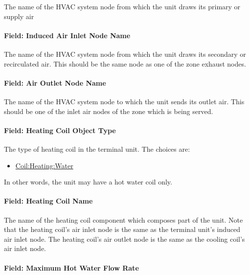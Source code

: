 The name of the HVAC system node from which the unit draws its primary or supply air

\paragraph{Field: Induced Air Inlet Node Name}\label{field-induced-air-inlet-node-name}

The name of the HVAC system node from which the unit draws its secondary or recirculated air. This should be the same node as one of the zone exhaust nodes.

\paragraph{Field: Air Outlet Node Name}\label{field-air-outlet-node-name-6}

The name of the HVAC system node to which the unit sends its outlet air. This should be one of the inlet air nodes of the zone which is being served.

\paragraph{Field: Heating Coil Object Type}\label{field-heating-coil-object-type-1}

The type of heating coil in the terminal unit. The choices are:

\begin{itemize}
\tightlist
\item
  \hyperref[coilheatingwater]{Coil:Heating:Water}
\end{itemize}

In other words, the unit may have a hot water coil only.

\paragraph{Field: Heating Coil Name}\label{field-heating-coil-name-1}

The name of the heating coil component which composes part of the unit. Note that the heating coil's air inlet node is the same as the terminal unit's induced air inlet node. The heating coil's air outlet node is the same as the cooling coil's air inlet node.

\paragraph{Field: Maximum Hot Water Flow Rate}\label{field-maximum-hot-water-flow-rate}

